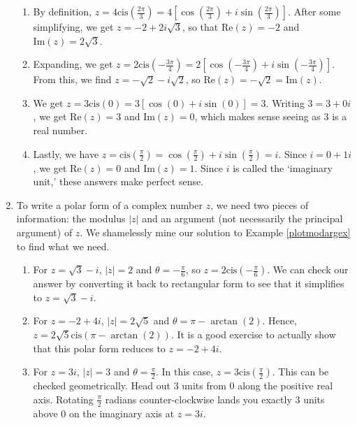 \begin{ex}
\begin{enumerate}
\begin{enumerate}

\item By definition, $z =4 \text{cis}\left(\frac{2\pi}{3}\right) = 4\left[\cos\left(\frac{2\pi}{3}\right) + i \sin\left(\frac{2\pi}{3}\right)\right]$. After some simplifying, we get $z = -2 + 2i\sqrt{3}$, so that $\text{Re}(z) = -2$ and $\text{Im}(z) = 2\sqrt{3}$.

\item Expanding, we get $z = 2 \text{cis}\left(-\frac{3\pi}{4}\right) = 2\left[\cos\left(-\frac{3\pi}{4}\right) + i \sin\left(-\frac{3\pi}{4}\right)\right]$. From this, we find $z= -\sqrt{2} - i\sqrt{2}$, so $\text{Re}(z) = -\sqrt{2} = \text{Im}(z)$.

\item  We get  $z = 3 \text{cis}(0) = 3\left[\cos(0) + i\sin(0)\right] = 3$.  Writing $3 = 3 + 0i$, we get $\text{Re}(z) = 3$ and $\text{Im}(z) = 0$, which makes sense seeing as $3$ is a real number.

\item  Lastly, we have  $z = \text{cis}\left(\frac{\pi}{2}\right) = \cos\left(\frac{\pi}{2}\right)+ i\sin\left(\frac{\pi}{2}\right) = i$.  Since $i = 0 + 1i$, we get $\text{Re}(z) = 0$ and $\text{Im}(z) = 1$.  Since $i$ is called the `imaginary unit,'  these answers make perfect sense.

\end{enumerate}

\item  To write a polar form of a complex number $z$, we need two pieces of information:  the modulus $|z|$ and an argument (not necessarily the principal argument) of $z$.   We shamelessly mine our solution to  Example \ref{plotmodargex} to find what we need.

\begin{enumerate}

\item  For $z = \sqrt{3}-i$, $|z| = 2$ and $\theta = -\frac{\pi}{6}$, so $z = 2 \text{cis}\left(-\frac{\pi}{6}\right)$.  We can check our answer by converting it back to rectangular form to see that it simplifies to $z = \sqrt{3} - i$.

\item  For $z = -2+4i$, $|z| = 2\sqrt{5}$ and $\theta = \pi - \arctan(2)$.  Hence, $z = 2\sqrt{5} \text{cis}(\pi - \arctan(2))$.  It is a good exercise to actually show that this polar form reduces to $z=-2+4i$.

\item  For $z = 3i$, $|z| = 3$ and $\theta = \frac{\pi}{2}$.  In this case, $z = 3 \text{cis}\left(\frac{\pi}{2}\right)$.  This can be checked geometrically.  Head out $3$ units from $0$ along the positive real axis. Rotating $\frac{\pi}{2}$ radians counter-clockwise lands you exactly $3$ units above $0$ on the imaginary axis at $z = 3i$.


\end{enumerate}
\end{enumerate}
\end{ex}
